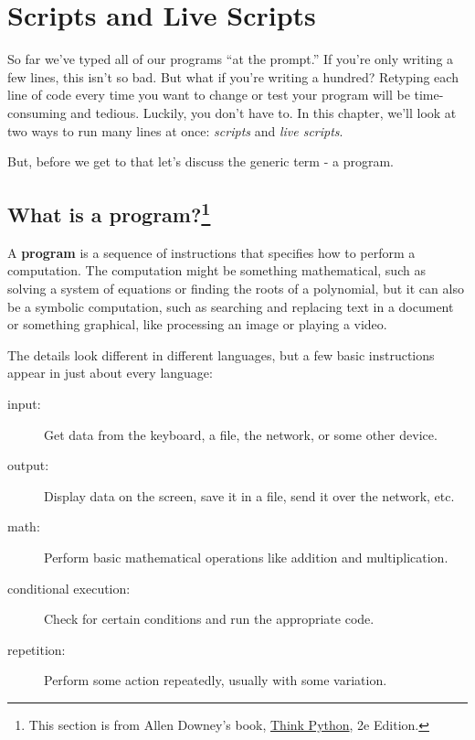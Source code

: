 \chapter{Scripts and Live Scripts}

So far we've typed all of our programs ``at the prompt.'' If you're only writing a few lines, this isn't so bad. But what if you're writing a hundred? Retyping each line of code every time you want to change or test your program will be time-consuming and tedious. Luckily, you don't have to. In this chapter, we'll look at two ways to run many lines at once: \emph{scripts} and \emph{live scripts}.

But, before we get to that let's discuss the generic term - a program.

\section[What is a program?]{What is a program?\protect\footnote{This section is from Allen Downey's book, \href{https://greenteapress.com/wp/think-python-2e/}{Think Python}, 2e Edition.}}

A {\bf program} is a sequence of instructions that specifies how to
perform a computation.  The computation might be something
mathematical, such as solving a system of equations or finding the
roots of a polynomial, but it can also be a symbolic computation, such
as searching and replacing text in a document or something
graphical, like processing an image or playing a video.

The details look different in different languages, but a few basic
instructions appear in just about every language:

\begin{description}

\item[input:] Get data from the keyboard, a file, the network, or some
other device.

\item[output:] Display data on the screen, save it in a
file, send it over the network, etc.

\item[math:] Perform basic mathematical operations like addition and
multiplication.

\item[conditional execution:] Check for certain conditions and
run the appropriate code.

\item[repetition:] Perform some action repeatedly, usually with
some variation.

\end{description}

